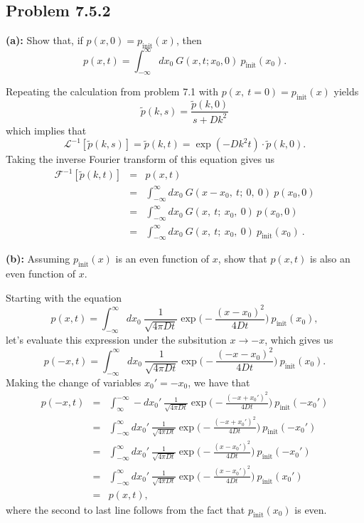 \subsection{Problem 7.5.2}
\textbf{(a):} Show that, if $p(x,0)=p_\text{init}(x)$, then
\begin{equation}
p(x,t) = \int_{-\infty}^{\infty} dx_0~G(x, t; x_0, 0)~p_\text{init}(x_0).
\end{equation}

Repeating the calculation from problem 7.1 with $p(x,~t=0) = p_\text{init}(x)$ yields
\begin{equation}
\tilde{p}(k, s)  = \frac{\tilde{p}(k, 0)}{s + D k^2}
\end{equation}
which implies that 
\begin{equation}
\mathcal{L}^{-1} [\tilde{p}(k, s)] = \tilde{p}(k, t) = \exp(-D k^2 t) \cdot \tilde{p}(k, 0).
\end{equation}
Taking the inverse Fourier transform of this equation gives us
\begin{eqnarray}
\mathcal{F}^{-1} [\tilde{p}(k, t)] &=& p(x,t) \nonumber \\
&=& \int_{-\infty}^{\infty} dx_0~ G(x-x_0,~t;~0,~0)~p(x_0,0) \nonumber \\
&=& \int_{-\infty}^{\infty} dx_0~ G(x,~t;~x_0,~0)~p(x_0,0) \nonumber \\
&=& \boxed{\int_{-\infty}^{\infty} dx_0~G(x,~t;~x_0,~0)~p_\text{init}(x_0)}~.
\end{eqnarray}

\textbf{(b):} Assuming $p_\text{init}(x)$ is an even function of $x$, show that $p(x,t)$ is also an even function of $x$.

Starting with the equation 
\begin{equation}
p(x,t) = \int_{-\infty}^{\infty} dx_0~\frac{1}{\sqrt{4 \pi D t} } \exp\bigg(- \frac{(x-x_0)^2}{4 D t}\bigg)~p_\text{init}(x_0),
\end{equation}
let's evaluate this expression under the subsitution $x \rightarrow -x$, which gives us
\begin{equation}
p(-x,t) = \int_{-\infty}^{\infty} dx_0~\frac{1}{\sqrt{4 \pi D t} } \exp\bigg(- \frac{(-x-x_0)^2}{4 D t}\bigg)~p_\text{init}(x_0).
\end{equation}
Making the change of variables $x_0' = -x_0$, we have that
\begin{eqnarray}
p(-x,t) &=& \int_{\infty}^{-\infty} -dx_0'~\frac{1}{\sqrt{4 \pi D t} } \exp\bigg(- \frac{(-x+x_0')^2}{4 D t}\bigg)~p_\text{init}(-x_0') \nonumber \\
&=& \int_{-\infty}^{\infty} dx_0'~\frac{1}{\sqrt{4 \pi D t} } \exp\bigg(- \frac{(-x+x_0')^2}{4 D t}\bigg)~p_\text{init}(-x_0') \nonumber \\
&=& \int_{-\infty}^{\infty} dx_0'~\frac{1}{\sqrt{4 \pi D t} } \exp\bigg(- \frac{(x-x_0')^2}{4 D t}\bigg)~p_\text{init}(-x_0') \nonumber \\
&=& \int_{-\infty}^{\infty} dx_0'~\frac{1}{\sqrt{4 \pi D t} } \exp\bigg(- \frac{(x-x_0')^2}{4 D t}\bigg)~p_\text{init}(x_0') \nonumber \\
&=& p(x,t),
\end{eqnarray}
where the second to last line follows from the fact that $p_\text{init}(x_0)$ is even.

